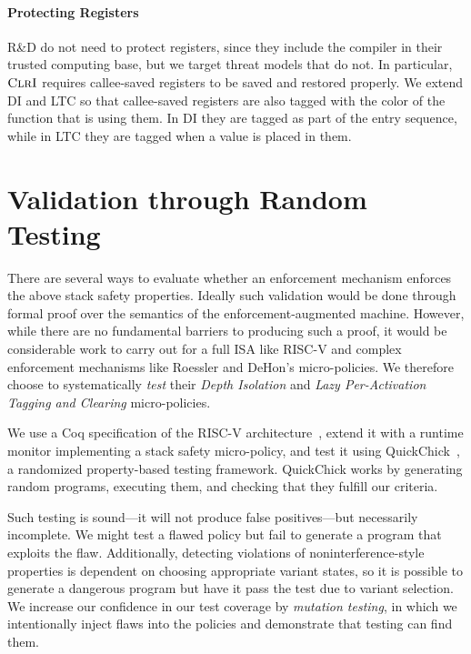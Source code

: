\documentclass[10pt,conference]{ieeetran}%
\theoremstyle{definition}
\begin{document}
\paragraph*{Protecting Registers}

R\&D do not need to protect registers, since they include the compiler in their
trusted computing base, but we target threat models that do not.
In particular, \(\textnormal{\sc ClrI}\) requires callee-saved
registers to be saved and restored properly. We extend DI and LTC
so that callee-saved registers are also tagged with the color of the
function that is using them. In DI they are tagged as part of the entry
sequence, while in LTC they are tagged when a value is placed in them.

\section{Validation through Random Testing}
\label{sec:testing}

There are several ways to evaluate whether an enforcement mechanism enforces the above
stack safety properties. Ideally such validation would be done through formal proof over
the semantics of the enforcement-augmented machine.
However, while there are no fundamental barriers to producing such a proof,
it would be considerable work to carry out for a full ISA like RISC-V and
complex enforcement mechanisms like Roessler and DeHon's micro-policies.
We therefore choose to systematically \emph{test} their {\em Depth Isolation}
and {\em Lazy Per-Activation Tagging and Clearing} micro-policies.

We use a Coq specification of the RISC-V architecture~\cite{Bourgeat2021AMF},
extend it with a runtime monitor implementing a stack safety micro-policy,
and test it using QuickChick~\cite{Pierce:SF4}, a randomized property-based
testing framework. QuickChick works by generating
random programs, executing them, and checking that they fulfill our criteria.

Such testing is sound---it will not produce false positives---but
necessarily incomplete. We might test a flawed policy but fail to generate a
program that exploits the flaw. Additionally, detecting violations of noninterference-style
properties is dependent on choosing appropriate variant states, so it is possible
to generate a dangerous program but have it pass the test due to variant selection.
We increase our confidence in our test coverage by {\em mutation testing},
in which we intentionally inject flaws into the policies and demonstrate that testing
can find them.
\end{document}
